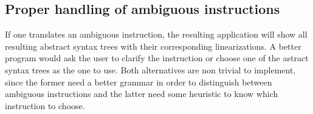 \subsection*{Proper handling of ambiguous instructions}
If one translates an ambiguous instruction, the resulting application will show all resulting abstract syntax trees with their corresponding linearizations. A better program would ask the user to clarify the instruction or choose one of the astract syntax trees as the one to use. Both alternatives are non trivial to implement, since the former need a better grammar in order to distinguish between ambiguous instructions and the latter need some heuristic to know which instruction to choose.